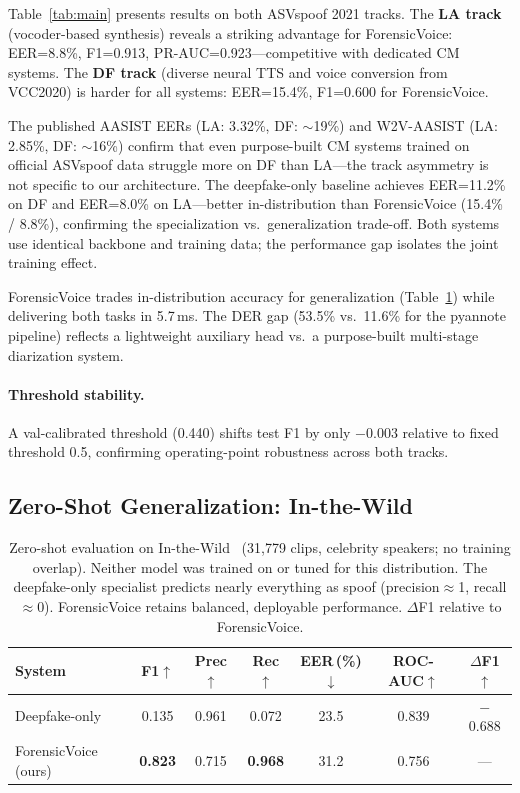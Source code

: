 \documentclass{article}
\newcommand{\fv}{ForensicVoice}
\begin{document}
Table~\ref{tab:main} presents results on both ASVspoof 2021 tracks.
The \textbf{LA track} (vocoder-based synthesis) reveals a striking advantage
for \fv{}: EER=8.8\%, F1=0.913, PR-AUC=0.923---competitive with dedicated CM
systems. The \textbf{DF track} (diverse neural TTS and voice conversion from
VCC2020) is harder for all systems: EER=15.4\%, F1=0.600 for \fv{}.

The published AASIST EERs (LA: 3.32\%, DF: $\sim$19\%) and W2V-AASIST
(LA: 2.85\%, DF: $\sim$16\%) confirm that even purpose-built CM systems
trained on official ASVspoof data struggle more on DF than LA---the track
asymmetry is not specific to our architecture. The deepfake-only baseline
achieves EER=11.2\% on DF and EER=8.0\% on LA---better in-distribution than
\fv{} (15.4\% / 8.8\%), confirming the specialization vs.\ generalization
trade-off. Both systems use identical backbone and training data; the
performance gap isolates the joint training effect.

\fv{} trades in-distribution accuracy for generalization (Table~\ref{tab:itw})
while delivering both tasks in 5.7\,ms. The DER gap (53.5\% vs.\ 11.6\%
for the pyannote pipeline) reflects a lightweight auxiliary head vs.\ a
purpose-built multi-stage diarization system.

\paragraph{Threshold stability.}
A val-calibrated threshold (0.440) shifts test F1 by only $-0.003$ relative
to fixed threshold 0.5, confirming operating-point robustness across both tracks.

\subsection{Zero-Shot Generalization: In-the-Wild}

\begin{table}[t]
  \caption{
    Zero-shot evaluation on In-the-Wild~\citep{wang2022itw} (31{,}779 clips,
    celebrity speakers; no training overlap). Neither model was trained on or
    tuned for this distribution. The deepfake-only specialist predicts nearly
    everything as spoof (precision$\approx$1, recall$\approx$0). \fv{}
    retains balanced, deployable performance. $\Delta$F1 relative to \fv{}.
  }
  \label{tab:itw}
  \centering
  \small
  \begin{tabular}{lcccccc}
    \toprule
    \textbf{System} & \textbf{F1}$\uparrow$ & \textbf{Prec}$\uparrow$
      & \textbf{Rec}$\uparrow$ & \textbf{EER\,(\%)}$\downarrow$
      & \textbf{ROC-AUC}$\uparrow$ & $\Delta$\textbf{F1}$\uparrow$ \\
    \midrule
    Deepfake-only & 0.135 & 0.961 & 0.072 & 23.5 & 0.839 & $-$0.688 \\
    \fv{} (ours)  & \textbf{0.823} & 0.715 & \textbf{0.968} & 31.2 & 0.756 & --- \\
    \bottomrule
  \end{tabular}
\end{table}
\end{document}
